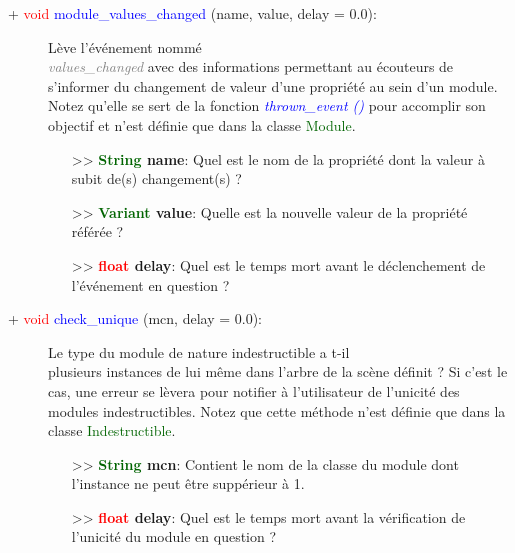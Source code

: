 \documentclass[a4paper, 11pt]{article}
\begin{document}
	\newpage \begin{description}
		\item [+ \textcolor{red}{void} \textcolor{blue}{module\_values\_changed} (name, value, delay = 
		0.0):] Lève l'événement nommé \textit{\textcolor{gray}{\\values\_changed}} avec des informations 
		permettant au écouteurs de s'informer du changement de valeur d'une propriété au sein d'un module. 
		Notez qu'elle se sert de la fonction \textit{\textcolor{blue}{thrown\_event ()}} pour accomplir son
		objectif et n'est définie que dans la classe \textcolor{darkgreen}{Module}.
		\begin{itemize}
			\item [>> \textbf{\textcolor{darkgreen}{String} name}:] Quel est le nom de la propriété dont la
			valeur à subit de(s) changement(s) ?
			\item [>> \textbf{\textcolor{darkgreen}{Variant} value}:] Quelle est la nouvelle valeur de la
			propriété référée ?
			\item [>> \textbf{\textcolor{red}{float} delay}:] Quel est le temps mort avant le déclenchement
			de l'événement en question ?\\
		\end{itemize}
	\end{description}
	\begin{description}
		\item [+ \textcolor{red}{void} \textcolor{blue}{check\_unique} (mcn, delay = 0.0):] Le type du
		module de nature indestructible a t-il \\plusieurs instances de lui même dans l'arbre de la scène
		définit ? Si c'est le cas, une erreur se lèvera pour notifier à l'utilisateur de l'unicité des
		modules indestructibles. Notez que cette méthode n'est définie que dans la classe
		\textcolor{darkgreen}{Indestructible}.
		\begin{itemize}
			\item [>> \textbf{\textcolor{darkgreen}{String} mcn}:] Contient le nom de la classe du module
			dont l'instance ne peut être suppérieur à 1.
			\item [>> \textbf{\textcolor{red}{float} delay}:] Quel est le temps mort avant la vérification
			de l'unicité du module en question ?\\
		\end{itemize}
	\end{description}
\end{document}
